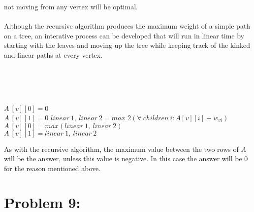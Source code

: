 \documentclass[12pt]{article}
\begin{document}
not moving from any vertex will be optimal.\\\\
Although the recursive algorithm produces the maximum weight of a simple path
on a tree, an interative process can be developed that will run in linear
time by starting with the leaves and moving up the tree while keeping
track of the kinked and linear paths at every vertex.\\\\
\begin{algorithm}[H]
\\
\\
\\
{$A\ [v][0] = 0$\\
$A\ [v][1] = 0$}
{$linear\ 1,\ linear\ 2 = max\_2(\forall\ children\ i: A[v][i]+w_{vi})$\\
$A\ [v][0] = max(linear\ 1,\ linear\ 2)$\\
$A\ [v][1] = linear\ 1,\ linear\ 2$\\
}
\end{algorithm}
As with the recursive algorithm, the maximum value between the two rows of $A$
will be the answer, unless this value is negative.  In this case the answer
will be $0$ for the reason mentioned above.

\section*{Problem 9: }
\end{document}
